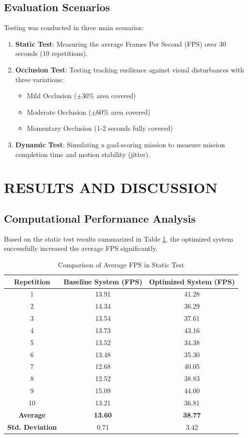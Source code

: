 \documentclass[12pt,a4paper]{article}
\begin{document}
\subsection{Evaluation Scenarios}
Testing was conducted in three main scenarios:
\begin{enumerate}
    \item \textbf{Static Test}: Measuring the average Frames Per Second (FPS) over 30 seconds (10 repetitions).
    \item \textbf{Occlusion Test}: Testing tracking resilience against visual disturbances with three variations:
    \begin{itemize}
        \item Mild Occlusion ($\pm$30\% area covered)
        \item Moderate Occlusion ($\pm$60\% area covered)
        \item Momentary Occlusion (1-2 seconds fully covered)
    \end{itemize}
    \item \textbf{Dynamic Test}: Simulating a goal-scoring mission to measure mission completion time and motion stability (jitter).
\end{enumerate}

\section{RESULTS AND DISCUSSION}

\subsection{Computational Performance Analysis}
Based on the static test results summarized in Table \ref{tab:fps}, the optimized system successfully increased the average FPS significantly.

\begin{table}[H]
\centering
\caption{Comparison of Average FPS in Static Test}
\label{tab:fps}
\begin{tabular}{|c|c|c|}
\hline
\textbf{Repetition} & \textbf{Baseline System (FPS)} & \textbf{Optimized System (FPS)} \\
\hline
1 & 13.91 & 41.28 \\
2 & 14.34 & 36.29 \\
3 & 13.54 & 37.61 \\
4 & 13.73 & 43.16 \\
5 & 13.52 & 34.38 \\
6 & 13.48 & 35.30 \\
7 & 12.68 & 40.05 \\
8 & 12.52 & 38.83 \\
9 & 15.09 & 44.00 \\
10 & 13.21 & 36.81 \\
\hline
\textbf{Average} & \textbf{13.60} & \textbf{38.77} \\
\textbf{Std. Deviation} & 0.71 & 3.42 \\
\hline
\end{tabular}
\end{table}
\end{document}
